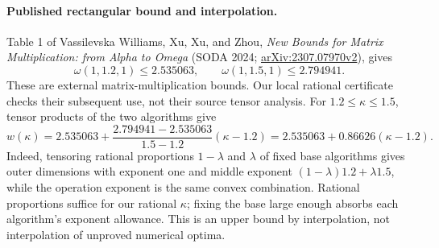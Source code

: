 \documentclass[11pt]{article}
\begin{document}
\paragraph{Published rectangular bound and interpolation.}
Table 1 of Vassilevska Williams, Xu, Xu, and Zhou,
\emph{New Bounds for Matrix Multiplication: from Alpha to Omega}
(SODA 2024; \href{https://arxiv.org/abs/2307.07970v2}{arXiv:2307.07970v2}),
gives
\[
\omega(1,1.2,1)\le2.535063,\qquad
\omega(1,1.5,1)\le2.794941.
\]
These are external matrix-multiplication bounds. Our local rational
certificate checks their subsequent use, not their source tensor analysis.
For $1.2\le\kappa\le1.5$, tensor products of the two algorithms give
\[
w(\kappa)=2.535063+
\frac{2.794941-2.535063}{1.5-1.2}(\kappa-1.2)
=2.535063+0.86626(\kappa-1.2).
\]
Indeed, tensoring rational proportions $1-\lambda$ and $\lambda$ of fixed
base algorithms gives outer dimensions with exponent one and middle
exponent $(1-\lambda)1.2+\lambda1.5$, while the operation exponent is the
same convex combination. Rational proportions suffice for our rational
$\kappa$; fixing the base large enough absorbs each algorithm's exponent
allowance. This is an upper bound by interpolation, not interpolation of
unproved numerical optima.
\end{document}
